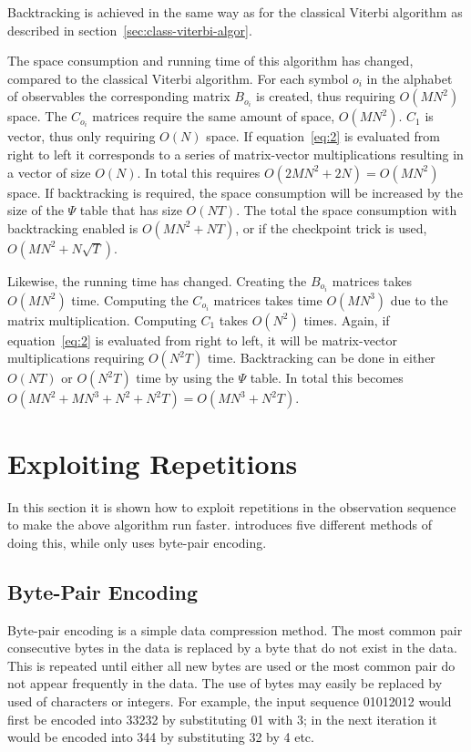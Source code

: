 Backtracking is achieved in the same way as for the classical Viterbi algorithm
as described in section~\ref{sec:class-viterbi-algor}.

The space consumption and running time of this algorithm has changed, compared
to the classical Viterbi algorithm. For each symbol $o_i$ in the alphabet of
observables the corresponding matrix $B_{o_i}$ is created, thus requiring
$O(M N^2)$ space. The $C_{o_i}$ matrices require the same amount of space,
$O(M N^2)$. $C_1$ is vector, thus only requiring $O(N)$ space. If
equation~\eqref{eq:2} is evaluated from right to left it corresponds to a
series of matrix-vector multiplications resulting in a vector of size $O(N)$.
In total this requires $O(2 M N^2 + 2 N) = O(M N^2)$ space. If backtracking is
required, the space consumption will be increased by the size of the $\Psi$
table that has size $O(N T)$. The total the space consumption with backtracking
enabled is $O(M N^2 + N T)$, or if the checkpoint trick is used, $O(M N^2 +
N \sqrt{T})$.

Likewise, the running time has changed. Creating the $B_{o_i}$ matrices takes
$O(M N^2)$ time. Computing the $C_{o_i}$ matrices takes time $O(M N^3)$ due to
the matrix multiplication. Computing $C_1$ takes $O(N^2)$ times. Again, if
equation~\eqref{eq:2} is evaluated from right to left, it will be matrix-vector
multiplications requiring $O(N^2 T)$ time. Backtracking can be done in either
$O(NT)$ or $O(N^2 T)$ time by using the $\Psi$ table. In total this becomes
$O(M N^2 + M N^3 + N^2 + N^2 T) = O(M N^3 + N^2 T)$.

\section{Exploiting Repetitions}
\label{sec:expl-repet}

In this section it is shown how to exploit repetitions in the observation sequence
to make the above algorithm run faster. \citet{lifshits2009speeding} introduces
five different methods of doing this, while \citet{sand2013ziphmmlib} only uses
byte-pair encoding.

\subsection{Byte-Pair Encoding}

Byte-pair encoding is a simple data compression method. The most common pair
consecutive bytes in the data is replaced by a byte that do not exist in the
data. This is repeated until either all new bytes are used or the most common
pair do not appear frequently in the data. The use of bytes may easily be
replaced by used of characters or integers. For example, the input sequence
01012012 would first be encoded into 33232 by substituting 01 with 3; in the
next iteration it would be encoded into 344 by substituting 32 by 4 etc.

